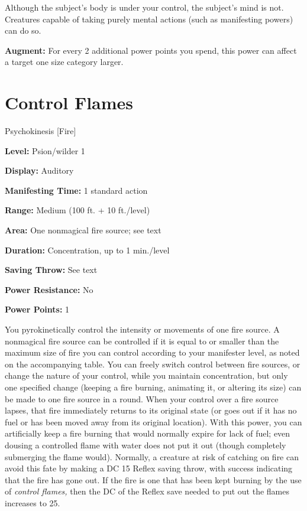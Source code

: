\documentclass{article}
\begin{document}
Although the subject's body is under your control, the subject's mind is not. Creatures 
capable of taking purely mental actions (such as manifesting powers) can do so.

\textbf{Augment:} For every 2 additional power points you spend, this power can 
affect a target one size category larger.

\vspace{12pt}
\section*{Control Flames}

Psychokinesis [Fire]

\textbf{Level:} Psion/wilder 1

\textbf{Display:} Auditory

\textbf{Manifesting Time:} 1 standard action

\textbf{Range:} Medium (100 ft. + 10 ft./level)

\textbf{Area:} One nonmagical fire source; see text

\textbf{Duration:} Concentration, up to 1 min./level

\textbf{Saving Throw:} See text

\textbf{Power Resistance:} No

\textbf{Power Points:} 1

You pyrokinetically control the intensity or movements of one fire source. A nonmagical 
fire source can be controlled if it is equal to or smaller than the maximum size 
of fire you can control according to your manifester level, as noted on the accompanying 
table. You can freely switch control between fire sources, or change the nature 
of your control, while you maintain concentration, but only one specified change 
(keeping a fire burning, animating it, or altering its size) can be made to one 
fire source in a round. When your control over a fire source lapses, that fire 
immediately returns to its original state (or goes out if it has no fuel or has 
been moved away from its original location). With this power, you can artificially 
keep a fire burning that would normally expire for lack of fuel; even dousing a 
controlled flame with water does not put it out (though completely submerging the 
flame would). Normally, a creature at risk of catching on fire can avoid this fate 
by making a DC 15 Reflex saving throw, with success indicating that the fire has 
gone out. If the fire is one that has been kept burning by the use of \textit{control 
flames, }then the DC of the Reflex save needed to put out the flames increases 
to 25.
\end{document}
